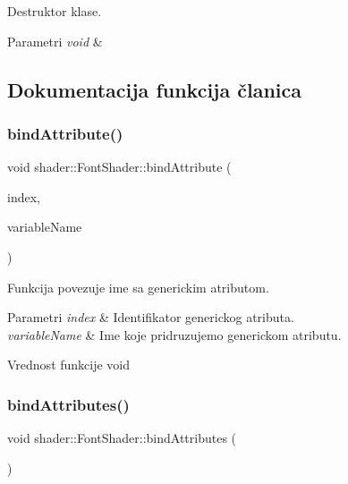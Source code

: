 Destruktor klase. 


\begin{DoxyParams}{Parametri}
{\em void} & \\
\hline
\end{DoxyParams}


\subsection{Dokumentacija funkcija članica}
\mbox{\label{classshader_1_1FontShader_abcd615d45f374de430a10226212fa40b}} 
\subsubsection{\texorpdfstring{bind\+Attribute()}{bindAttribute()}}
{\footnotesize\ttfamily void shader\+::\+Font\+Shader\+::bind\+Attribute (\begin{DoxyParamCaption}\item[{int}]{index,  }\item[{const char $\ast$}]{variable\+Name }\end{DoxyParamCaption})}



Funkcija povezuje ime sa generickim atributom. 


\begin{DoxyParams}{Parametri}
{\em index} & Identifikator generickog atributa. \\
\hline
{\em variable\+Name} & Ime koje pridruzujemo generickom atributu. \\
\hline
\end{DoxyParams}
\begin{DoxyReturn}{Vrednost funkcije}
void 
\end{DoxyReturn}
\mbox{\label{classshader_1_1FontShader_abd2634c5c218f6912c9cc5d63899aca9}} 
\subsubsection{\texorpdfstring{bind\+Attributes()}{bindAttributes()}}
{\footnotesize\ttfamily void shader\+::\+Font\+Shader\+::bind\+Attributes (\begin{DoxyParamCaption}\item[{void}]{ }\end{DoxyParamCaption})}



